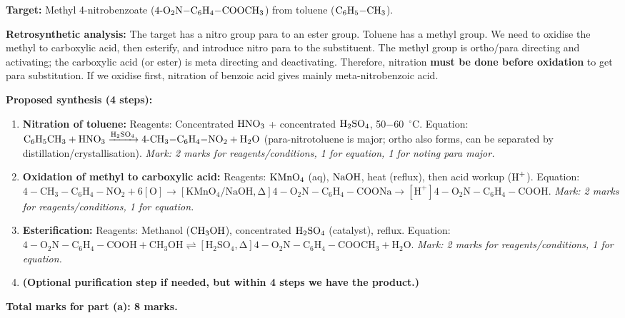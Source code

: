 \documentclass[11pt]{article}
\begin{document}
\begin{corrige}
\textbf{Target:} Methyl 4-nitrobenzoate (\(\ce{4-O2N-C6H4-COOCH3}\)) from toluene (\(\ce{C6H5-CH3}\)).

\textbf{Retrosynthetic analysis:}
The target has a nitro group para to an ester group. Toluene has a methyl group. We need to oxidise the methyl to carboxylic acid, then esterify, and introduce nitro para to the substituent. The methyl group is ortho/para directing and activating; the carboxylic acid (or ester) is meta directing and deactivating. Therefore, nitration \textbf{must be done before oxidation} to get para substitution. If we oxidise first, nitration of benzoic acid gives mainly meta-nitrobenzoic acid.

\textbf{Proposed synthesis (4 steps):}

\begin{enumerate}
\item \textbf{Nitration of toluene:} 
Reagents: Concentrated \(\ce{HNO3}\) + concentrated \(\ce{H2SO4}\), \SI{50-60}{\ensuremath{{}^{\circ}\mathrm{C}}}.
Equation: \(\ce{C6H5CH3 + HNO3 ->[H2SO4] 4-CH3-C6H4-NO2 + H2O}\) (para-nitrotoluene is major; ortho also forms, can be separated by distillation/crystallisation).
\textit{Mark: 2 marks for reagents/conditions, 1 for equation, 1 for noting para major.}

\item \textbf{Oxidation of methyl to carboxylic acid:}
Reagents: \(\ce{KMnO4}\) (aq), \(\ce{NaOH}\), heat (reflux), then acid workup (\(\ce{H+}\)).
Equation: \(\ensuremath{\mathrm{4-CH_{3}-C_{6}H_{4}-NO_{2} + 6[O] \rightarrow [KMnO_{4}/NaOH, \Delta] 4-O_{2}N-C_{6}H_{4}-COONa \rightarrow [H^{+}] 4-O_{2}N-C_{6}H_{4}-COOH}}\).
\textit{Mark: 2 marks for reagents/conditions, 1 for equation.}

\item \textbf{Esterification:}
Reagents: Methanol (\(\ce{CH3OH}\)), concentrated \(\ce{H2SO4}\) (catalyst), reflux.
Equation: \(\ensuremath{\mathrm{4-O_{2}N-C_{6}H_{4}-COOH + CH_{3}OH \rightleftharpoons [H_{2}SO_{4}, \Delta] 4-O_{2}N-C_{6}H_{4}-COOCH_{3} + H_{2}O}}\).
\textit{Mark: 2 marks for reagents/conditions, 1 for equation.}

\item \textbf{(Optional purification step if needed, but within 4 steps we have the product.)}
\end{enumerate}

\textbf{Total marks for part (a): 8 marks.}


\end{corrige}
\end{document}
